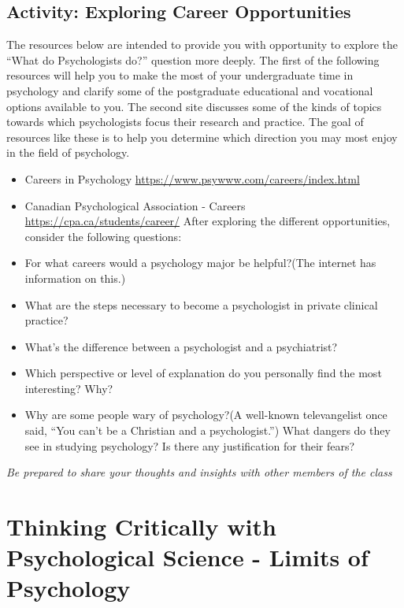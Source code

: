 \documentclass[
]{book}
\providecommand{\tightlist}{%
  \setlength{\itemsep}{0pt}\setlength{\parskip}{0pt}}
\begin{document}
\hypertarget{activity-exploring-career-opportunities}{%
\subsection*{Activity: Exploring Career Opportunities}\label{activity-exploring-career-opportunities}}

\begin{reflect}
The resources below are intended to provide you with opportunity to explore the ``What do Psychologists do?'' question more deeply. The first of the following resources will help you to make the most of your undergraduate time in psychology and clarify some of the postgraduate educational and vocational options available to you. The second site discusses some of the kinds of topics towards which psychologists focus their research and practice. The goal of resources like these is to help you determine which direction you may most enjoy in the field of psychology.

\begin{itemize}
\tightlist
\item
  Careers in Psychology {\url{https://www.psywww.com/careers/index.html}}
\item
  Canadian Psychological Association - Careers {\url{https://cpa.ca/students/career/}}
  After exploring the different opportunities, consider the following questions:
\item
  For what careers would a psychology major be helpful?(The internet has information on this.)
\item
  What are the steps necessary to become a psychologist in private clinical practice?
\item
  What's the difference between a psychologist and a psychiatrist?
\item
  Which perspective or level of explanation do you personally find the most interesting? Why?
\item
  Why are some people wary of psychology?(A well-known televangelist once said, ``You can't be a Christian and a psychologist.'') What dangers do they see in studying psychology? Is there any justification for their fears?
\end{itemize}

\emph{Be prepared to share your thoughts and insights with other members of the class}
\end{reflect}

\hypertarget{thinking-critically-with-psychological-science---limits-of-psychology}{%
\section{Thinking Critically with Psychological Science - Limits of Psychology}\label{thinking-critically-with-psychological-science---limits-of-psychology}}
\end{document}
